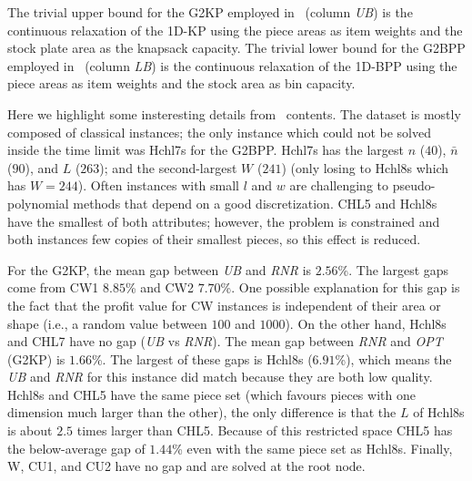 \documentclass[9pt]{entcs}
\begin{document}
The trivial upper bound for the G2KP employed in~ (column \emph{UB}) is the continuous relaxation of the 1D-KP using the piece areas as item weights and the stock plate area as the knapsack capacity. %
The trivial lower bound for the G2BPP employed in~ (column \emph{LB}) is the continuous relaxation of the 1D-BPP using the piece areas as item weights and the stock area as bin capacity. %

Here we highlight some insteresting details from~ contents.
The dataset is mostly composed of classical instances; the only instance which could not be solved inside the time limit was Hchl7s for the G2BPP.
Hchl7s has the largest \(n\) (\(40\)), \(\bar{n}\) (\(90\)), and \(L\) (\(263\)); and the second-largest \(W\) (\(241\)) (only losing to Hchl8s which has \(W = 244\)).
Often instances with small \underline{\(l\)} and \underline{\(w\)} are challenging to pseudo-polynomial methods that depend on a good discretization.
CHL5 and Hchl8s have the smallest of both attributes; however, the problem is constrained and both instances few copies of their smallest pieces, so this effect is reduced.

For the G2KP, the mean gap between \emph{UB} and \emph{RNR} is \(2.56\)\%. The largest gaps come from CW1 \(8.85\)\% and CW2 \(7.70\)\%.
One possible explanation for this gap is the fact that the profit value for CW instances is independent of their area or shape (i.e., a random value between \(100\) and \(1000\)).
On the other hand, Hchl8s and CHL7 have no gap (\emph{UB} vs \emph{RNR}).
The mean gap between \emph{RNR} and \emph{OPT} (G2KP) is \(1.66\)\%.
The largest of these gaps is Hchl8s (\(6.91\)\%), which means the \emph{UB} and \emph{RNR} for this instance did match because they are both low quality.
Hchl8s and CHL5 have the same piece set (which favours pieces with one dimension much larger than the other), the only difference is that the \(L\) of Hchl8s is about \(2.5\) times larger than CHL5.
Because of this restricted space CHL5 has the below-average gap of \(1.44\)\% even with the same piece set as Hchl8s.
Finally, W, CU1, and CU2 have no gap and are solved at the root node.
\end{document}
